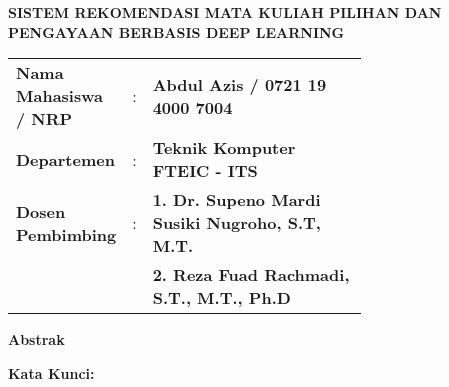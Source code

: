 \begin{center}
    \uppercase{\textbf{\large Sistem rekomendasi Mata Kuliah Pilihan dan Pengayaan berbasis Deep Learning}}
\end{center}

\vspace*{6 mm}
\begin{adjustwidth}{}{}
    \begin{tabular}{lcp{0.7\linewidth}}

        \noindent\textbf{Nama Mahasiswa / NRP} & : & \textbf{Abdul Azis / 0721 19 4000 7004}                \\
        \noindent\textbf{Departemen}           & : & \textbf{Teknik Komputer FTEIC - ITS}                   \\
        \noindent\textbf{Dosen Pembimbing}     & : & \textbf{1. Dr. Supeno Mardi Susiki Nugroho, S.T, M.T.} \\
                                               &   & \textbf{2. Reza Fuad Rachmadi, S.T., M.T., Ph.D}       \\
    \end{tabular}
\end{adjustwidth}

\vspace{6 mm}
\noindent
\textbf{Abstrak}
\vspace{3 mm}

\lipsum[2-4]

\vspace{6 mm}
\noindent
\textbf{Kata Kunci: }



